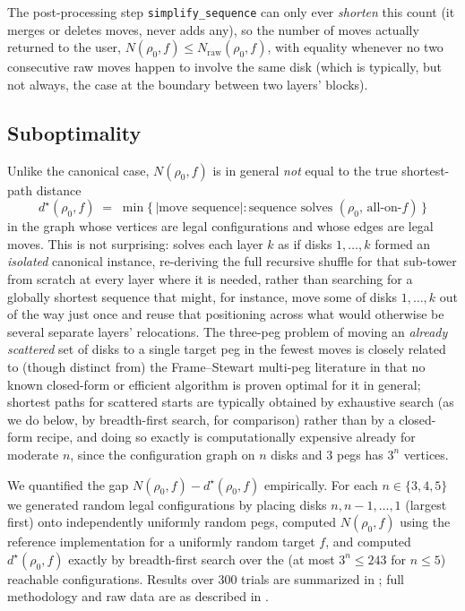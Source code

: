 \documentclass[11pt]{article}
\begin{document}
The post-processing step \texttt{simplify\_sequence} can only ever
\emph{shorten} this count (it merges or deletes moves, never adds any), so
the number of moves actually returned to the user,
$N(\rho_0,f) \le N_{\mathrm{raw}}(\rho_0,f)$, with equality whenever no two
consecutive raw moves happen to involve the same disk (which is typically,
but not always, the case at the boundary between two layers' blocks).

\subsection{Suboptimality}
\label{sec:suboptimality}

Unlike the canonical case, $N(\rho_0,f)$ is in general \emph{not} equal to
the true shortest-path distance
\[
  d^\star(\rho_0,f) \;=\; \min\{\, |\text{move sequence}| : \text{sequence solves } (\rho_0,\, \text{all-on-}f) \,\}
\]
in the graph whose vertices are legal configurations and whose edges are
legal moves. This is not surprising:  solves each layer
$k$ as if disks $1,\dots,k$ formed an \emph{isolated} canonical instance,
re-deriving the full recursive shuffle for that sub-tower from scratch at
every layer where it is needed, rather than searching for a globally
shortest sequence that might, for instance, move some of disks $1,\dots,k$
out of the way just once and reuse that positioning across what would
otherwise be several separate layers' relocations. The three-peg problem
of moving an \emph{already scattered} set of disks to a single target peg
in the fewest moves is closely related to (though distinct from) the
Frame--Stewart multi-peg literature \cite{frame1941,stewart1941,hinz2018}
in that no known closed-form or efficient algorithm is proven optimal for
it in general; shortest paths for scattered starts are typically obtained
by exhaustive search (as we do below, by breadth-first search, for
comparison) rather than by a closed-form recipe, and doing so exactly is
computationally expensive already for moderate $n$, since the configuration
graph on $n$ disks and $3$ pegs has $3^n$ vertices.

We quantified the gap $N(\rho_0,f) - d^\star(\rho_0,f)$ empirically.
For each $n \in \{3,4,5\}$ we generated random legal configurations by
placing disks $n, n-1, \dots, 1$ (largest first) onto independently
uniformly random pegs, computed $N(\rho_0,f)$ using the reference
implementation for a uniformly random target $f$, and computed
$d^\star(\rho_0,f)$ exactly by breadth-first search over the (at most
$3^n \le 243$ for $n\le5$) reachable configurations. Results over $300$
trials are summarized in ; full methodology and raw
data are as described in .
\end{document}
